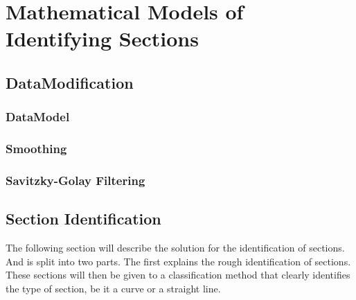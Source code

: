 \chapter{Mathematical Models of Identifying Sections}

\section{DataModification}

\subsection{DataModel}

\subsection{Smoothing}

\subsection{Savitzky-Golay Filtering}

\newpage
\section{Section Identification}
The following section will describe the solution for the identification of sections. And is split into two parts. The first explains the rough identification of sections. These sections will then be given to a classification method that clearly identifies the type of section, be it a curve or a straight line. 

